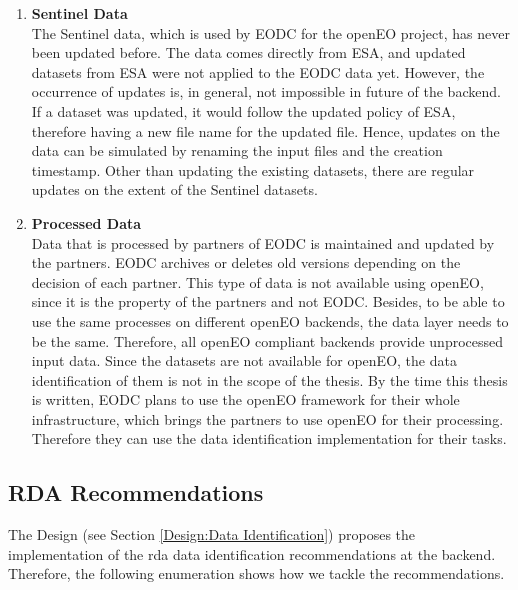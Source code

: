 \documentclass[draft,final]{vutinfth} %
\begin{document}
\begin{enumerate}
	\item \textbf{Sentinel Data} \\
	The Sentinel data, which is used by EODC for the openEO project, has never been updated before. The data comes directly from ESA, and updated datasets from ESA were not applied to the EODC data yet. However, the occurrence of updates is, in general, not impossible in future of the backend. If a dataset was updated, it would follow the updated policy of ESA, therefore having a new file name for the updated file. Hence, updates on the data can be simulated by renaming the input files and the creation timestamp. Other than updating the existing datasets, there are regular updates on the extent of the Sentinel datasets.   
	\item \textbf{Processed Data} \\
	Data that is processed by partners of EODC is maintained and updated by the partners. EODC archives or deletes old versions depending on the decision of each partner. This type of data is not available using openEO, since it is the property of the partners and not EODC. Besides, to be able to use the same processes on different openEO backends, the data layer needs to be the same. Therefore, all openEO compliant backends provide unprocessed input data. Since the datasets are not available for openEO, the data identification of them is not in the scope of the thesis. By the time this thesis is written, EODC plans to use the openEO framework for their whole infrastructure, which brings the partners to use openEO for their processing. Therefore they can use the data identification implementation for their tasks.
\end{enumerate}

\subsection{RDA Recommendations}\label{Evaluation:dataidentification}
The Design (see Section \ref{Design:Data Identification}) proposes the implementation of the \acrshort{rda} data identification recommendations at the backend. Therefore, the following enumeration shows how we tackle the recommendations. 
\end{document}
